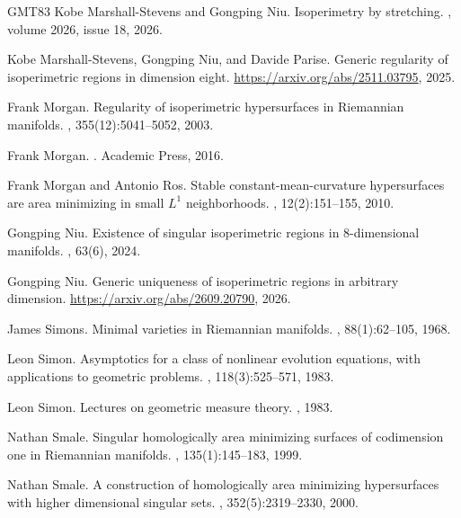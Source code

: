 \documentclass[12pt]{article}
\begin{document}
\begin{thebibliography}{GMT83}
Kobe {Marshall-Stevens} and Gongping Niu.
\newblock Isoperimetry by stretching.
, volume 2026, issue
  18, 2026.

Kobe {Marshall-Stevens}, Gongping Niu, and Davide Parise.
\newblock Generic regularity of isoperimetric regions in dimension eight.
\newblock \url{https://arxiv.org/abs/2511.03795}, 2025.

Frank Morgan.
\newblock Regularity of isoperimetric hypersurfaces in {R}iemannian manifolds.
,
  355(12):5041–5052, 2003.

Frank Morgan.
.
\newblock Academic Press, 2016.

Frank Morgan and Antonio Ros.
\newblock Stable constant-mean-curvature hypersurfaces are area minimizing in
  small ${L}^1$ neighborhoods.
, 12(2):151–155, 2010.

Gongping Niu.
\newblock Existence of singular isoperimetric regions in 8-dimensional
  manifolds.
,
  63(6), 2024.

Gongping Niu.
\newblock Generic uniqueness of isoperimetric regions in arbitrary dimension.
\newblock \url{https://arxiv.org/abs/2609.20790}, 2026.

James Simons.
\newblock Minimal varieties in {R}iemannian manifolds.
, 88(1):62--105, 1968.

Leon Simon.
\newblock Asymptotics for a class of nonlinear evolution equations, with
  applications to geometric problems.
, 118(3):525--571, 1983.

Leon Simon.
\newblock Lectures on geometric measure theory.
, 1983.

Nathan Smale.
\newblock Singular homologically area minimizing surfaces of codimension one in
  {R}iemannian manifolds.
, 135(1):145--183, 1999.

Nathan Smale.
\newblock A construction of homologically area minimizing hypersurfaces with
  higher dimensional singular sets.
,
  352(5):2319--2330, 2000.


\end{thebibliography}
\end{document}
